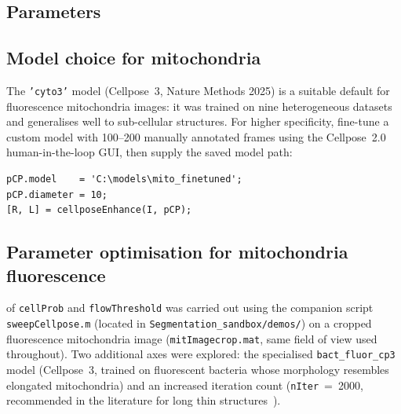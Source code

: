 \documentclass[a4paper, justified]{tufte-book}
\begin{document}
\subsection*{Parameters}

\subsection*{Model choice for mitochondria}

The \texttt{'cyto3'} model (Cellpose~3, Nature Methods 2025) is a suitable
default for fluorescence mitochondria images: it was trained on nine
heterogeneous datasets and generalises well to sub-cellular structures.  For
higher specificity, fine-tune a custom model with 100--200 manually annotated
frames using the Cellpose~2.0 human-in-the-loop GUI, then supply the saved
model path:

\begin{lstlisting}
pCP.model    = 'C:\models\mito_finetuned';
pCP.diameter = 10;
[R, L] = cellposeEnhance(I, pCP);
\end{lstlisting}

\subsection*{Parameter optimisation for mitochondria fluorescence}
\label{sec:cellpose-sweep}

 of \texttt{cellProb} and
\texttt{flowThreshold} was carried out using the companion script
\texttt{sweepCellpose.m} (located in
\texttt{Segmentation\_sandbox/demos/}) on a cropped fluorescence
mitochondria image (\texttt{mitImagecrop.mat}, same field of view used
throughout).  Two additional axes were explored: the specialised
\texttt{bact\_fluor\_cp3} model (Cellpose~3, trained on fluorescent
bacteria whose morphology resembles elongated mitochondria) and an
increased iteration count (\texttt{nIter}~=~2000, recommended in the
literature for long thin structures~\cite{Stringer2025}).
\end{document}
